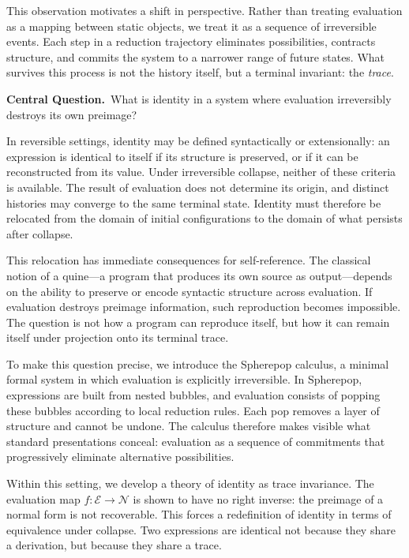 \documentclass[12pt, oneside]{amsbook}
\theoremstyle{plain}
\theoremstyle{definition}
\theoremstyle{remark}
\newcommand{\Expr}{\mathcal{E}}
\newcommand{\NF}{\mathcal{N}}
\newcommand{\evalf}{f}
\begin{document}
This observation motivates a shift in perspective. Rather than treating
evaluation as a mapping between static objects, we treat it as a sequence of
irreversible events. Each step in a reduction trajectory eliminates
possibilities, contracts structure, and commits the system to a narrower range
of future states. What survives this process is not the history itself, but a
terminal invariant: the \emph{trace}.

\begin{tcolorbox}[hinge]
  \textbf{Central Question.}\ What is identity in a system where evaluation
  irreversibly destroys its own preimage?
\end{tcolorbox}

In reversible settings, identity may be defined syntactically or
extensionally: an expression is identical to itself if its structure is
preserved, or if it can be reconstructed from its value. Under irreversible
collapse, neither of these criteria is available. The result of evaluation does
not determine its origin, and distinct histories may converge to the same
terminal state. Identity must therefore be relocated from the domain of initial
configurations to the domain of what persists after collapse.

This relocation has immediate consequences for self-reference. The classical
notion of a quine---a program that produces its own source as output---depends
on the ability to preserve or encode syntactic structure across evaluation.
If evaluation destroys preimage information, such reproduction becomes
impossible. The question is not how a program can reproduce itself, but how it
can remain itself under projection onto its terminal trace.

To make this question precise, we introduce the Spherepop calculus, a minimal
formal system in which evaluation is explicitly irreversible. In Spherepop,
expressions are built from nested bubbles, and evaluation consists of popping
these bubbles according to local reduction rules. Each pop removes a layer of
structure and cannot be undone. The calculus therefore makes visible what
standard presentations conceal: evaluation as a sequence of commitments that
progressively eliminate alternative possibilities.

Within this setting, we develop a theory of identity as trace invariance. The
evaluation map $\evalf : \Expr \to \NF$ is shown to have no right inverse: the
preimage of a normal form is not recoverable. This forces a redefinition of
identity in terms of equivalence under collapse. Two expressions are identical
not because they share a derivation, but because they share a trace.
\end{document}
